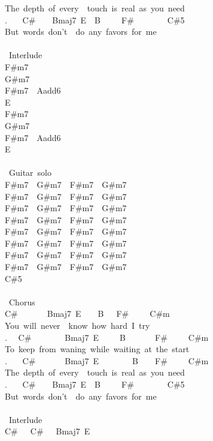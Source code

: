 {The\ depth\ of\ every\ \ touch\ is\ real\ as\ you\ need\\
. \ \ \ C\#\ \ \ \ Bmaj7\ E\ \ B\ \ \ \ \ F\#\ \ \ \ \ \ \ \ C\#5\\
But\ words\ don't\ \ do\ any\ favors\ for\ me\\
\\
\lbrack\ Interlude\rbrack\\
F\#m7\\
G\#m7\\
F\#m7\ \ Aadd6\\
E\\
F\#m7\\
G\#m7\\
F\#m7\ \ Aadd6\\
E\\
\\
\lbrack\ Guitar\ solo\rbrack\\
F\#m7\ \ G\#m7\ \ F\#m7\ \ G\#m7\\
F\#m7\ \ G\#m7\ \ F\#m7\ \ G\#m7\\
F\#m7\ \ G\#m7\ \ F\#m7\ \ G\#m7\\
F\#m7\ \ G\#m7\ \ F\#m7\ \ G\#m7\\
F\#m7\ \ G\#m7\ \ F\#m7\ \ G\#m7\\
F\#m7\ \ G\#m7\ \ F\#m7\ \ G\#m7\\
F\#m7\ \ G\#m7\ \ F\#m7\ \ G\#m7\\
F\#m7\ \ G\#m7\ \ F\#m7\ \ G\#m7\\
C\#5\\
\\
\lbrack\ Chorus\rbrack\\
C\#\ \ \ \ \ \ \ Bmaj7\ E\ \ \ \ B\ \ \ F\#\ \ \ \ \ C\#m\\
You\ will\ never\ \ know\ how\ hard\ I\ try\\
. \ \ C\#\ \ \ \ \ \ \ \ Bmaj7\ E\ \ \ \ \ B\ \ \ \ \ \ \ F\#\ \ \ \ \ C\#m\\
To\ keep\ from\ waning\ while\ waiting\ at\ the\ start\\
. \ \ \ C\#\ \ \ \ \ \ \ Bmaj7\ E\ \ \ \ \ \ \ \ B\ \ \ \ F\#\ \ \ \ \ C\#m\\
The\ depth\ of\ every\ \ touch\ is\ real\ as\ you\ need\\
. \ \ \ C\#\ \ \ \ Bmaj7\ E\ \ B\ \ \ \ \ F\#\ \ \ \ \ \ \ \ C\#5\\
But\ words\ don't\ \ do\ any\ favors\ for\ me\\
\\
\lbrack\ Interlude\rbrack\\
C\#\ \ \ C\#\ \ \ Bmaj7\ E\\
}
